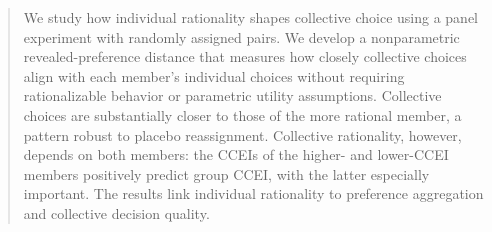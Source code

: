 \documentclass[11 pt]{article}
\begin{document}
\begin{abstract}

We study how individual rationality shapes collective choice using a panel experiment with randomly assigned pairs. We develop a nonparametric revealed-preference distance that measures how closely collective choices align with each member’s individual choices without requiring rationalizable behavior or parametric utility assumptions. Collective choices are substantially closer to those of the more rational member, a pattern robust to placebo reassignment. Collective rationality, however, depends on both members: the CCEIs of the higher- and lower-CCEI members positively predict group CCEI, with the latter especially important. The results link individual rationality to preference aggregation and collective decision quality.


\end{abstract}
\end{document}
